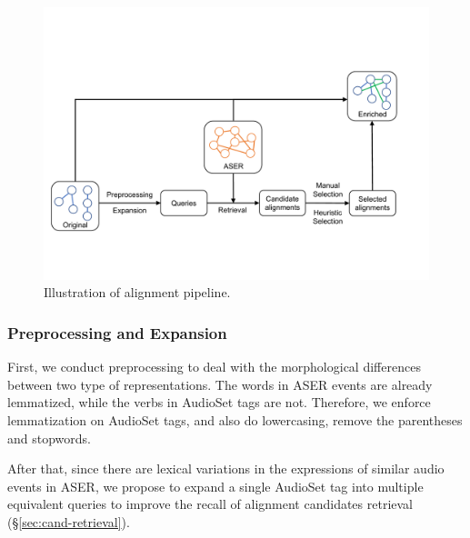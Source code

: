 \begin{figure}[htbp]
\setlength{\abovecaptionskip}{0.cm}
\setlength{\belowcaptionskip}{-0.5cm}
  \centering
  \includegraphics[width=1\linewidth]{figures/pipeline1.pdf}
  \caption{Illustration of alignment pipeline.}
  \label{fig:pipeline}
  \end{figure}

\subsubsection{Preprocessing and Expansion}

First, we conduct preprocessing to deal with the morphological differences between two type of representations. The words in ASER events are already lemmatized, while the verbs in AudioSet tags are not. Therefore, we enforce lemmatization on AudioSet tags, and also do lowercasing, remove the parentheses and stopwords. %

After that, since there are lexical variations in the expressions of similar audio events in ASER, we propose to expand a single AudioSet tag into multiple equivalent queries to improve the recall of alignment candidates retrieval (\S \ref{sec:cand-retrieval}). 

